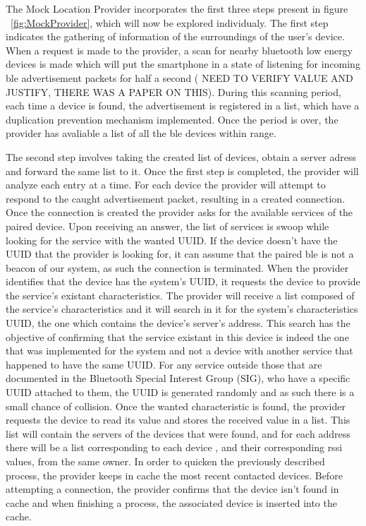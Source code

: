 \documentclass[a4paper]{IEEEtran}
\begin{document}
The Mock Location Provider incorporates the first three steps present in figure ~\ref{fig:MockProvider}, which will now be explored individualy. The first step indicates the gathering of information of the surroundings of the user's device. When a request is made to the provider, a scan for nearby bluetooth low energy devices is made which will put the smartphone in a state of listening for incoming ble advertisement packets for half a second ( NEED TO VERIFY VALUE AND JUSTIFY, THERE WAS A PAPER ON THIS). During this scanning period, each time a device is found, the advertisement is registered in a list, which have a duplication prevention mechanism implemented. Once the period is over, the provider has avaliable a list of all the ble devices within range.   

The second step involves taking the created list of devices, obtain a server adress and forward the same list to it. Once the first step is completed, the provider will analyze each entry at a time. For each device the provider will attempt to respond to the caught advertisement packet, resulting in a created connection.  Once the connection is created the provider asks for the available services of the paired device. Upon receiving an answer, the list of services is swoop while looking for the service with the wanted UUID. If the device doesn't have the UUID that the provider is looking for, it can assume that the paired ble is not a beacon of our system, as such the connection is terminated. When the provider identifies that the device has the system's UUID, it requests the device to provide the service's existant characteristics. The provider will receive a list composed of the service's characteristics and it will search in it for the system's characteristics UUID, the one which contains the device's server's address. This search has the objective of confirming that the service existant in this device is indeed the one that was implemented for the system and not a device with another service that happened to have the same UUID. For any service outside those that are documented in the Bluetooth Special Interest Group (SIG), who have a specific UUID attached to them, the UUID is generated randomly and as such there is a small chance of collision. Once the wanted characteristic is found, the provider requests the device to read its value and stores the received value in a list. This list will contain the servers of the devices that were found, and for each address there will be a list corresponding to each device , and their corresponding rssi values, from the same owner. In order to quicken the previously described process, the provider keeps in cache the most recent contacted devices. Before attempting a connection, the provider confirms that the device isn't found in cache and when finishing a process, the associated device is inserted into the cache.
\end{document}
